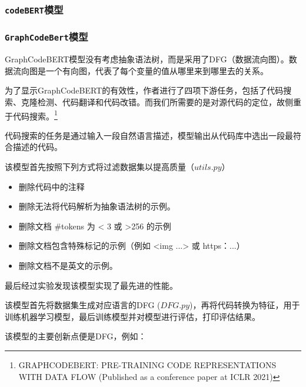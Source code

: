 \documentclass[
]{article}
\begin{document}
\subsubsection{\texorpdfstring{\texttt{codeBERT}模型}{codeBERT模型}}\label{codebertux6a21ux578b}

\subsubsection{\texorpdfstring{\texttt{GraphCodeBert}模型}{GraphCodeBert模型}}\label{graphcodebertux6a21ux578b}

GraphCodeBERT模型没有考虑抽象语法树，而是采用了DFG（数据流向图）。数据流向图是一个有向图，代表了每个变量的值从哪里来到哪里去的关系。

为了显示GraphCodeBERT的有效性，作者进行了四项下游任务，包括了代码搜索、克隆检测、代码翻译和代码改错。而我们所需要的是对源代码的定位，故侧重于代码搜索。\footnote{GRAPHCODEBERT:
  PRE-TRAINING CODE REPRESENTATIONS WITH DATA FLOW (Published as a
  conference paper at ICLR 2021)}

代码搜索的任务是通过输入一段自然语言描述，模型输出从代码库中选出一段最符合描述的代码。

该模型首先按照下列方式将过滤数据集以提高质量（\(utils.py\)）

\begin{itemize}
  \item
        删除代码中的注释
  \item
        删除无法将代码解析为抽象语法树的示例。
  \item
        删除文档 \#tokens 为 \textless{} 3 或 \textgreater256 的示例
  \item
        删除文档包含特殊标记的示例（例如 \textless img ...\textgreater{} 或
        https：...）
  \item
        删除文档不是英文的示例。
\end{itemize}

最后经过实验发现该模型实现了最先进的性能。

该模型首先将数据集生成对应语言的DFG
(\(DFG.py\))，再将代码转换为特征，用于训练机器学习模型，最后训练模型并对模型进行评估，打印评估结果。

该模型的主要创新点便是DFG，例如：
\end{document}
